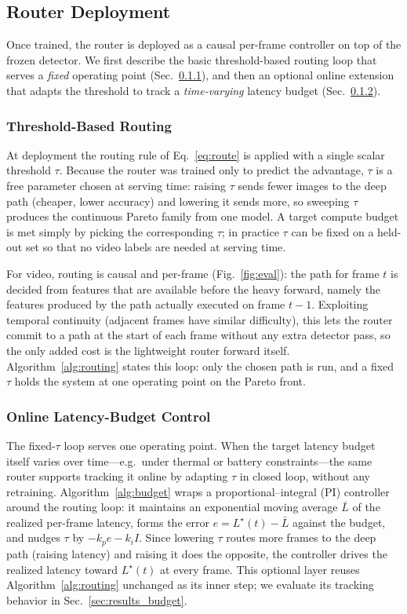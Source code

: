\subsection{Router Deployment}
\label{sec:method_deploy}
Once trained, the router is deployed as a causal per-frame controller on top of the
frozen detector. We first describe the basic threshold-based routing loop that
serves a \emph{fixed} operating point (Sec.~\ref{sec:method_deploy_route}), and then
an optional online extension that adapts the threshold to track a \emph{time-varying}
latency budget (Sec.~\ref{sec:method_deploy_budget}).

\subsubsection{Threshold-Based Routing}
\label{sec:method_deploy_route}
At deployment the routing rule of Eq.~\eqref{eq:route} is applied with a single
scalar threshold $\tau$.
Because the router was trained only to predict the
advantage, $\tau$ is a free parameter chosen at serving time: raising $\tau$ sends
fewer images to the deep path (cheaper, lower accuracy) and lowering it sends more,
so sweeping $\tau$ produces the continuous Pareto family from one model. A target
compute budget is met simply by picking the corresponding $\tau$; in practice
$\tau$ can be fixed on a held-out set so that no video labels are needed at serving
time.

For video, routing is causal and per-frame (Fig.~\ref{fig:eval}): the path for
frame $t$ is decided from features that are available before the heavy forward,
namely the features produced by the path actually executed on frame $t{-}1$.
Exploiting temporal continuity (adjacent frames have similar difficulty), this lets
the router commit to a path at the start of each frame without any extra detector
pass, so the only added cost is the lightweight router forward itself.
Algorithm~\ref{alg:routing} states this loop: only the chosen path is run, and a
fixed $\tau$ holds the system at one operating point on the Pareto front.



\subsubsection{Online Latency-Budget Control}
\label{sec:method_deploy_budget}
The fixed-$\tau$ loop serves one operating point. When the target latency budget
itself varies over time---e.g.\ under thermal or battery constraints---the same
router supports tracking it online by adapting $\tau$ in closed loop, without any
retraining. Algorithm~\ref{alg:budget} wraps a proportional--integral (PI)
controller around the routing loop: it maintains an exponential moving average
$\bar{L}$ of the realized per-frame latency, forms the error $e=L^\star(t)-\bar{L}$
against the budget, and nudges $\tau$ by $-k_p e - k_i I$. Since lowering $\tau$
routes more frames to the deep path (raising latency) and raising it does the
opposite, the controller drives the realized latency toward $L^\star(t)$ at every
frame. This optional layer reuses Algorithm~\ref{alg:routing} unchanged as its
inner step; we evaluate its tracking behavior in Sec.~\ref{sec:results_budget}.

